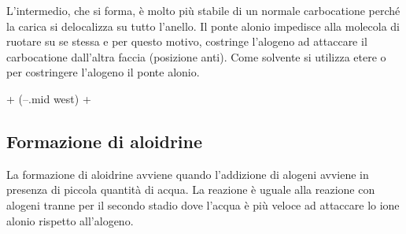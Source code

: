 L'intermedio, che si forma, è molto più stabile di un normale carbocatione perché la carica si delocalizza su tutto l'anello. Il ponte alonio impedisce alla molecola di ruotare su se stessa e per questo motivo, costringe l'alogeno ad attaccare il carbocatione dall'altra faccia (posizione anti). Come solvente si utilizza etere o  per costringere l'alogeno il ponte alonio.

\begingroup
\chemnameinit{}
\begin{reaction}
	 + 
	\arrow(--.mid west)
	 + 
\end{reaction}
\endgroup

\subsection{Formazione di aloidrine}
La formazione di aloidrine avviene quando l'addizione di alogeni avviene in presenza di piccola quantità di acqua. La reazione è uguale alla reazione con alogeni tranne per il secondo stadio dove l'acqua è più veloce ad attaccare lo ione alonio rispetto all'alogeno.

